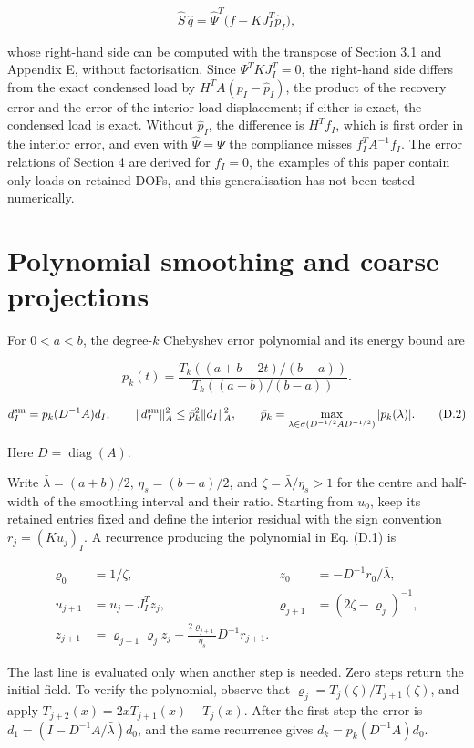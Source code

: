 \documentclass[preprint,12pt,authoryear]{elsarticle}
\begin{document}
\[
\widehat S\,\widehat q=\widehat\Psi^T\big(f-KJ_I^T\widehat p_I\big),
\]

whose right-hand side can be computed with the transpose of Section 3.1 and Appendix E, without factorisation. Since \(\Psi^TKJ_I^T=0\), the right-hand side differs from the exact condensed load by \(H^TA(p_I-\widehat p_I)\), the product of the recovery error and the error of the interior load displacement; if either is exact, the condensed load is exact. Without \(\widehat p_I\), the difference is \(H^Tf_I\), which is first order in the interior error, and even with \(\widehat\Psi=\Psi\) the compliance misses \(f_I^TA^{-1}f_I\). The error relations of Section 4 are derived for \(f_I=0\), the examples of this paper contain only loads on retained DOFs, and this generalisation has not been tested numerically.

\section{Polynomial smoothing and coarse projections}

For \(0<a<b\), the degree-\(k\) Chebyshev error polynomial and its energy bound are

\[
p_k(t)=\frac{T_k((a+b-2t)/(b-a))}{T_k((a+b)/(b-a))}.
\tag{D.1}
\]

\[
d_I^{\rm sm}=p_k(D^{-1}A)d_I,\qquad
\|d_I^{\rm sm}\|_A^2\le\bar p_k^2\|d_I\|_A^2,\qquad
\bar p_k=\max_{\lambda\in\sigma(D^{-1/2}AD^{-1/2})}|p_k(\lambda)|.
\tag{D.2}
\]

Here \(D=\operatorname{diag}(A)\).

Write \(\bar\lambda=(a+b)/2\), \(\eta_s=(b-a)/2\), and \(\zeta=\bar\lambda/\eta_s>1\) for the centre and half-width of the smoothing interval and their ratio. Starting from \(u_0\), keep its retained entries fixed and define the interior residual with the sign convention \(r_j=(Ku_j)_I\). A recurrence producing the polynomial in Eq. (D.1) is

\[
\begin{aligned}
\varrho_0&=1/\zeta,& z_0&=-D^{-1}r_0/\bar\lambda,\\
u_{j+1}&=u_j+J_I^Tz_j,&
\varrho_{j+1}&=(2\zeta-\varrho_j)^{-1},\\
z_{j+1}&=\varrho_{j+1}\varrho_j z_j
 -\frac{2\varrho_{j+1}}{\eta_s}D^{-1}r_{j+1}.
\end{aligned}
\tag{D.3}
\]

The last line is evaluated only when another step is needed. Zero steps return the initial field. To verify the polynomial, observe that \(\varrho_j=T_j(\zeta)/T_{j+1}(\zeta)\), and apply \(T_{j+2}(x)=2xT_{j+1}(x)-T_j(x)\). After the first step the error is \(d_1=(I-D^{-1}A/\bar\lambda)d_0\), and the same recurrence gives \(d_k=p_k(D^{-1}A)d_0\).
\end{document}

